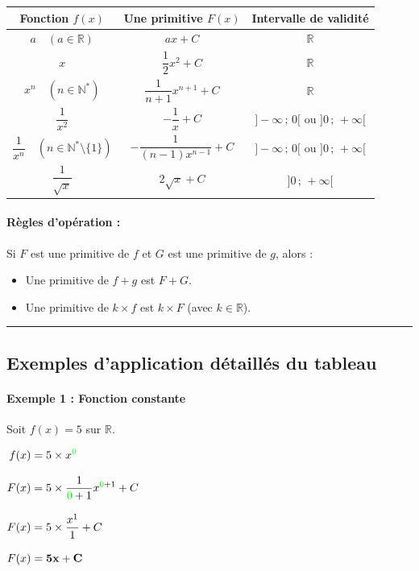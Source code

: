 \documentclass[12pt,a4paper]{article}
\begin{document}
\begin{center}
\renewcommand{\arraystretch}{1.9}
\begin{tabular}{|c|c|c|}
\hline
\textbf{Fonction } $f(x)$ & \textbf{Une primitive } $F(x)$ & \textbf{Intervalle de validité} \\
\hline
$a \quad (a \in \mathbb{R})$ & $ax + C$ & $\mathbb{R}$ \\
\hline
$x$ & $\dfrac{1}{2}x^2 + C$ & $\mathbb{R}$ \\
\hline
$x^n \quad (n \in \mathbb{N}^*)$ & $\dfrac{1}{n+1}x^{n+1} + C$ & $\mathbb{R}$ \\
\hline
$\dfrac{1}{x^2}$ & $-\dfrac{1}{x} + C$ & $]-\infty \,;\, 0[$ ou $]0 \,;\, +\infty[$ \\
\hline
$\dfrac{1}{x^n} \quad (n \in \mathbb{N}^* \setminus \{1\})$ & $-\dfrac{1}{(n-1)x^{n-1}} + C$ & $]-\infty \,;\, 0[$ ou $]0 \,;\, +\infty[$ \\
\hline
$\dfrac{1}{\sqrt{x}}$ & $2\sqrt{x} + C$ & $]0 \,;\, +\infty[$ \\
\hline
\end{tabular}
\end{center}

\paragraph{Règles d'opération :}
Si $F$ est une primitive de $f$ et $G$ est une primitive de $g$, alors :
\begin{itemize}
    \item Une primitive de $f + g$ est $F + G$.
    \item Une primitive de $k \times f$ est $k \times F$ (avec $k \in \mathbb{R}$).
\end{itemize}

\vspace{0.3cm}
\hrule
\vspace{0.3cm}

\subsection*{\color{myred}Exemples d'application détaillés du tableau}

\paragraph{Exemple 1 : Fonction constante}
Soit $f(x) = 5$ sur $\mathbb{R}$.

$
\begin{aligned}
f(x) &= 5 \times x^{\color{green}0}\\[3mm]
F(x) &= 5 \times \dfrac{1}{{\color{green}0}+1} x^{{\color{green}0}+1} + C\\[3mm]
F(x) &= 5 \times \frac{x^1}{1} + C\\[3mm]
F(x) &= \mathbf{5x + C}
\end{aligned}
$
\end{document}
